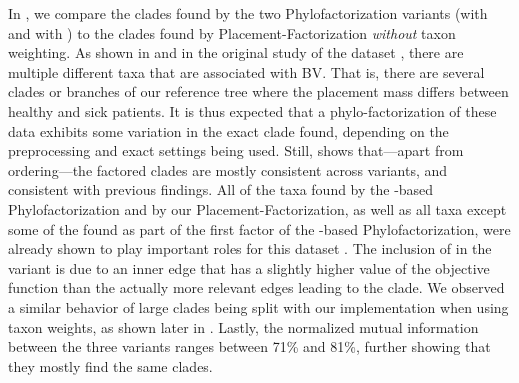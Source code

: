 In , we compare the clades found by the two Phylofactorization variants
(with  and with )
to the clades found by Placement-Factorization \emph{without} taxon weighting.
As shown in  and in the original study of the dataset \cite{Srinivasan2012},
there are multiple different taxa that are associated with \acl{BV}.
That is, there are several clades or branches of our reference tree
where the placement mass differs between healthy and sick patients.
It is thus expected that a phylo-factorization of these data exhibits some variation in the exact clade found,
depending on the preprocessing and exact settings being used.
Still,  shows that---apart from ordering---the factored clades
are mostly consistent across variants, and consistent with previous findings.
All of the taxa found by the -based Phylofactorization and by our Placement-Factorization,
as well as all taxa except some of the 
found as part of the first factor of the -based Phylofactorization,
were already shown to play important roles for this dataset \cite{Srinivasan2012}.
The inclusion of  in the  variant is due to
an inner edge that has a slightly higher value of the objective function
than the actually more relevant edges leading to the  clade.
We observed a similar behavior of large clades being split with our implementation when using taxon weights,
as shown later in .
Lastly, the normalized mutual information \cite{Vinh2010} between the three variants ranges between
71\% and 81\%, further showing that they mostly find the same clades.

